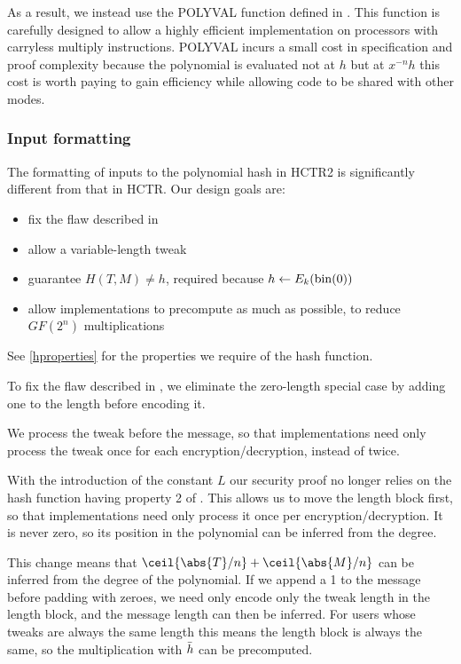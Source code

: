\documentclass[hctr.tex]{subfiles}
\begin{document}
As a result, we instead use the POLYVAL function
defined in \cite{aes_gcm_siv}.
This function is carefully designed to allow
a highly efficient implementation
on processors with carryless multiply instructions.
POLYVAL incurs a small cost in specification and proof complexity
because the polynomial is evaluated not at \(h\) but at \(x^{-n}h\) 
this cost is worth paying to gain efficiency while
allowing code to be shared with other modes.

\subsubsection{Input formatting}

The formatting of inputs to the polynomial hash in HCTR2 is significantly
different from that in HCTR. Our design goals are:

\begin{itemize}
    \item fix the flaw described in \cite{kumarhctr}
    \item allow a variable-length tweak
    \item guarantee \(H(T, M) \neq h\), required
    because \(h \gets E_k(\operatorname{bin}(0))\)
    \item allow implementations to precompute as much as possible, to reduce \(GF(2^n)\) multiplications
\end{itemize}

See \autoref{hproperties}
for the properties we require of the hash function.

To fix the flaw described in \cite{kumarhctr},
we eliminate the zero-length special case
by adding one to the length before encoding it.

We process the tweak before the message, so that implementations need only
process the tweak once for each encryption/decryption, instead of twice.

With the introduction of the constant \(L\)
our security proof no longer relies on the hash function
having property 2 of \cite[Section~3.3]{hctr}.
This allows us to move the length block first, so
that implementations need only process it once per encryption/decryption.
It is never zero, so its position in the
polynomial can be inferred from the degree.

This change means that \(\ceil{\abs{T}/n} + \ceil{\abs{M}/n}\)
can be inferred from the degree of the polynomial.  
If we append a 1 to the message before padding with zeroes,
we need only encode only the tweak length in the length block,
and the message length can then be inferred.
For users whose tweaks are always the same length
this means the length block is always the same, 
so the multiplication with \(\bar{h}\) can be
precomputed.
\end{document}
